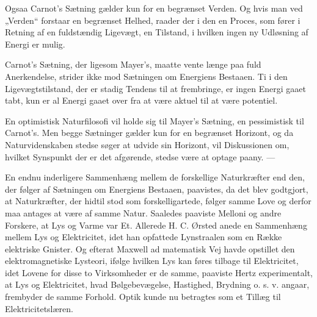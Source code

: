 \documentclass[12pt,a4paper,openany]{book}
\newcommand{\opage}[1]{\marginnote{\footnotesize\textit{[#1]}}}
\begin{document}
Ogsaa Carnot’s Sætning gælder kun for en begrænset Verden. Og
hvis man ved „Verden“ forstaar en begrænset Helhed, raader der i
den en Proces, som fører i Retning af en fuldstændig Ligevægt, en
Tilstand, i hvilken ingen ny Udløsning af Energi er mulig.

Carnot’s Sætning, der ligesom Mayer’s, maatte vente længe paa
fuld Anerkendelse, strider ikke mod Sætningen om Energiens Bestaaen.
Ti i den Ligevægtstilstand, der er stadig Tendens til at frembringe,
er ingen Energi gaaet tabt, kun er al Energi gaaet over fra
at være aktuel til at være potentiel.

\opage{30}En optimistisk Naturfilosofi vil holde sig til Mayer’s Sætning, en
pessimistisk til Carnot’s. Men begge Sætninger gælder kun for en
begrænset Horizont, og da Naturvidenskaben stedse søger at udvide
sin Horizont, vil Diskussionen om, hvilket Synspunkt der er det afgørende,
stedse være at optage paany. ---

En endnu inderligere Sammenhæng mellem de forskellige Naturkræfter
end den, der følger af Sætningen om Energiens Bestaaen,
paavistes, da det blev godtgjort, at Naturkræfter, der hidtil stod som
forskelligartede, følger samme Love og derfor maa antages at være
af samme Natur. Saaledes paaviste Melloni og andre Forskere, at
Lys og Varme var Et. Allerede H. C. Ørsted anede en Sammenhæng
mellem Lys og Elektricitet, idet han opfattede Lynstraalen som
en Række elektriske Gnister. Og efterat Maxwell ad matematisk Vej
havde opstillet den elektromagnetiske Lysteori, ifølge hvilken Lys
kan føres tilbage til Elektricitet, idet Lovene for disse to Virksomheder
er de samme, paaviste Hertz experimentalt, at Lys og Elektricitet,
hvad Bølgebevægelse, Hastighed, Brydning o. s. v. angaar,
frembyder de samme Forhold. Optik kunde nu betragtes som et Tillæg
til Elektricitetslæren.
\end{document}
